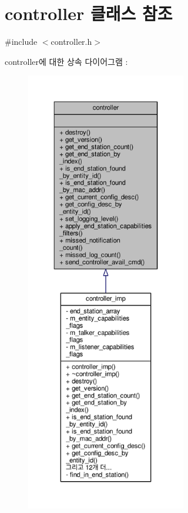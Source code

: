 \hypertarget{classavdecc__lib_1_1controller}{}\section{controller 클래스 참조}
\label{classavdecc__lib_1_1controller}


{\ttfamily \#include $<$controller.\+h$>$}



controller에 대한 상속 다이어그램 \+: 
\nopagebreak
\begin{figure}[H]
\begin{center}
\leavevmode
\includegraphics[height=550pt]{classavdecc__lib_1_1controller__inherit__graph}
\end{center}
\end{figure}


